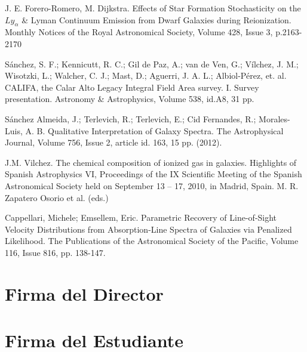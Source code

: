\documentclass[12pt]{article}
\begin{document}
\begin{thebibliography}{10}

 J. E. Forero-Romero, M. Dijkstra. Effects of Star Formation Stochasticity on the $Ly_{\alpha}$ \&
Lyman Continuum Emission from Dwarf Galaxies during
Reionization. Monthly Notices of the Royal Astronomical Society, Volume 428, Issue 3, p.2163-2170

 S\'anchez, S. F.; Kennicutt, R. C.; Gil de Paz,
A.; van de Ven, G.; V\'ilchez, J. M.; Wisotzki, L.; Walcher, C. J.;
Mast, D.; Aguerri, J. A. L.; Albiol-P\'erez, et. al. CALIFA, the
  Calar Alto Legacy Integral Field Area survey. I. Survey
  presentation. Astronomy \& Astrophysics, Volume 538, id.A8, 31 pp.

 S\'anchez Almeida, J.; Terlevich, R.; Terlevich, E.;
  Cid Fernandes, R.; Morales-Luis, A. B. Qualitative Interpretation of
  Galaxy Spectra. The Astrophysical Journal, Volume 756, Issue 2,
  article id. 163, 15 pp. (2012).

 J.M. Vilchez. The chemical composition of ionized
  gas in galaxies. Highlights of Spanish Astrophysics VI, Proceedings
  of the IX Scientific Meeting of the Spanish Astronomical Society
  held on September 13 -- 17, 2010, in Madrid, Spain. M. R. Zapatero
  Osorio et al. (eds.)

 Cappellari, Michele; Emsellem, Eric. Parametric
  Recovery of Line-of-Sight Velocity Distributions from
  Absorption-Line Spectra of Galaxies via Penalized Likelihood. The
  Publications of the Astronomical Society of the Pacific, Volume 116,
  Issue 816, pp. 138-147.

\end{thebibliography}

\section*{Firma del Director}
\vspace{1.5cm}

\section*{Firma del Estudiante	}
\end{document}
